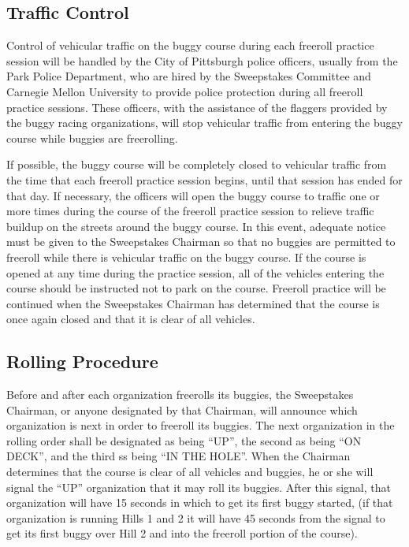 \subsection{Traffic Control}

	Control of vehicular traffic on the buggy course during each freeroll practice
	session will be handled by the City of Pittsburgh police officers, usually from
	the Park Police Department, who are hired by the Sweepstakes Committee and
	Carnegie Mellon University to provide police protection during all freeroll
	practice sessions. These officers, with the assistance of the flaggers provided
	by the buggy racing organizations, will stop vehicular traffic from entering
	the buggy course while buggies are freerolling.

	If possible, the buggy course will be completely closed to vehicular traffic
	from the time that each freeroll practice session begins, until that session
	has ended for that day. If necessary, the officers will open the buggy course
	to traffic one or more times during the course of the freeroll practice session
	to relieve traffic buildup on the streets around the buggy course. In this
	event, adequate notice must be given to the Sweepstakes Chairman so that no
	buggies are permitted to freeroll while there is vehicular traffic on the buggy
	course. If the course is opened at any time during the practice session, all of
	the vehicles entering the course should be instructed not to park on the
	course. Freeroll practice will be continued when the Sweepstakes Chairman has
	determined that the course is once again closed and that it is clear of all
	vehicles.

\subsection{Rolling Procedure}

	Before and after each organization freerolls its buggies, the Sweepstakes
	Chairman, or anyone designated by that Chairman, will announce which
	organization is next in order to freeroll its buggies. The next organization in
	the rolling order shall be designated as being ``UP'', the second as being ``ON
	DECK'', and the third ss being ``IN THE HOLE''. When the Chairman determines
	that the course is clear of all vehicles and buggies, he or she will signal the
	``UP'' organization that it may roll its buggies. After this signal, that
	organization will have 15 seconds in which to get its first buggy started, (if
	that organization is running Hills 1 and 2 it will have 45 seconds from the
	signal to get its first buggy over Hill 2 and into the freeroll portion of the
	course).

